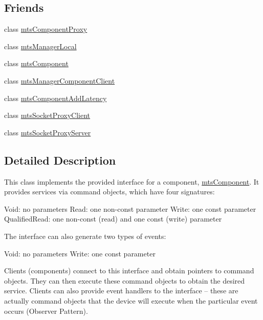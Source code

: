 \subsection*{Friends}
\begin{DoxyCompactItemize}
\item 
class \hyperlink{classmts_interface_provided_a744ae66bbeeeba6ef38e59a2dd5e9743}{mts\-Component\-Proxy}
\item 
class \hyperlink{classmts_interface_provided_a31c1c611dbb103ac58ed40d84960baa0}{mts\-Manager\-Local}
\item 
class \hyperlink{classmts_interface_provided_ae29f4c60efad294ccb670e319c43a4c1}{mts\-Component}
\item 
class \hyperlink{classmts_interface_provided_abdd48306351388730b5025e062ae1069}{mts\-Manager\-Component\-Client}
\item 
class \hyperlink{classmts_interface_provided_a1db5727d8599da1a9ba8b9c7ba379b44}{mts\-Component\-Add\-Latency}
\item 
class \hyperlink{classmts_interface_provided_a29fb04198d83763f1d10ca5e03f2fa2f}{mts\-Socket\-Proxy\-Client}
\item 
class \hyperlink{classmts_interface_provided_add2bf103c2ba9373d7a6cacccfe1046d}{mts\-Socket\-Proxy\-Server}
\end{DoxyCompactItemize}


\subsection{Detailed Description}
This class implements the provided interface for a component, \hyperlink{classmts_component}{mts\-Component}. It provides services via command objects, which have four signatures\-:

Void\-: no parameters Read\-: one non-\/const parameter Write\-: one const parameter Qualified\-Read\-: one non-\/const (read) and one const (write) parameter

The interface can also generate two types of events\-:

Void\-: no parameters Write\-: one const parameter

Clients (components) connect to this interface and obtain pointers to command objects. They can then execute these command objects to obtain the desired service. Clients can also provide event handlers to the interface -- these are actually command objects that the device will execute when the particular event occurs (Observer Pattern).

